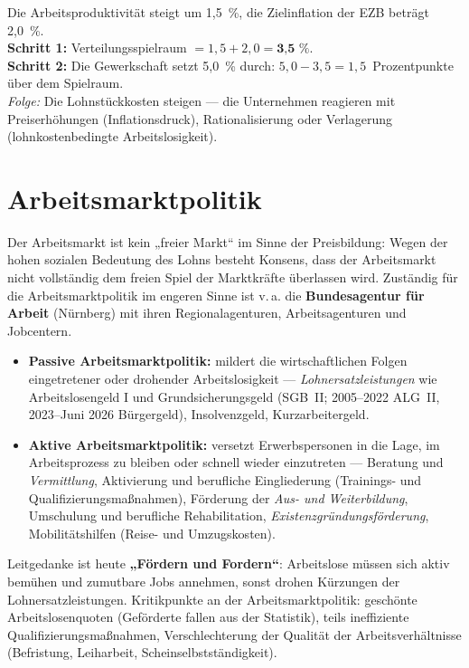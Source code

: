 \documentclass[11pt, a4paper]{article}
\begin{document}
\begin{beispiel}
Die Arbeitsproduktivität steigt um 1,5~\%, die Zielinflation der EZB beträgt 2,0~\%.\\[0.3em]
\textbf{Schritt 1:} Verteilungsspielraum $= 1{,}5 + 2{,}0 = \textbf{3{,}5~\%}$.\\
\textbf{Schritt 2:} Die Gewerkschaft setzt 5,0~\% durch: $5{,}0 - 3{,}5 =
1{,}5$~Prozentpunkte über dem Spielraum.\\[0.3em]
\emph{Folge:} Die Lohnstückkosten steigen --- die Unternehmen reagieren mit
Preiserhöhungen (Inflationsdruck), Rationalisierung oder Verlagerung
(lohnkostenbedingte Arbeitslosigkeit).
\end{beispiel}

\section{Arbeitsmarktpolitik}

Der Arbeitsmarkt ist kein „freier Markt`` im Sinne der Preisbildung: Wegen der hohen
sozialen Bedeutung des Lohns besteht Konsens, dass der Arbeitsmarkt nicht vollständig dem
freien Spiel der Marktkräfte überlassen wird. Zuständig für die Arbeitsmarktpolitik im
engeren Sinne ist v.\,a. die \textbf{Bundesagentur für Arbeit} (Nürnberg) mit ihren
Regionalagenturen, Arbeitsagenturen und Jobcentern.

\begin{itemize}
  \item \textbf{Passive Arbeitsmarktpolitik:} mildert die wirtschaftlichen Folgen
    eingetretener oder drohender Arbeitslosigkeit --- \emph{Lohnersatzleistungen} wie
    Arbeitslosengeld I und Grundsicherungsgeld (SGB~II; 2005--2022 ALG~II, 2023--Juni 2026 Bürgergeld),
    Insolvenzgeld, Kurzarbeitergeld.
  \item \textbf{Aktive Arbeitsmarktpolitik:} versetzt Erwerbspersonen in die Lage, im
    Arbeitsprozess zu bleiben oder schnell wieder einzutreten --- Beratung und
    \emph{Vermittlung}, Aktivierung und berufliche Eingliederung (Trainings- und
    Qualifizierungsmaßnahmen), Förderung der \emph{Aus- und Weiterbildung}, Umschulung und
    berufliche Rehabilitation, \emph{Existenzgründungsförderung}, Mobilitätshilfen (Reise-
    und Umzugskosten).
\end{itemize}

Leitgedanke ist heute \textbf{„Fördern und Fordern``}: Arbeitslose müssen sich aktiv
bemühen und zumutbare Jobs annehmen, sonst drohen Kürzungen der Lohnersatzleistungen.
Kritikpunkte an der Arbeitsmarktpolitik: geschönte Arbeitslosenquoten (Geförderte fallen
aus der Statistik), teils ineffiziente Qualifizierungsmaßnahmen, Verschlechterung der
Qualität der Arbeitsverhältnisse (Befristung, Leiharbeit, Scheinselbstständigkeit).
\end{document}
